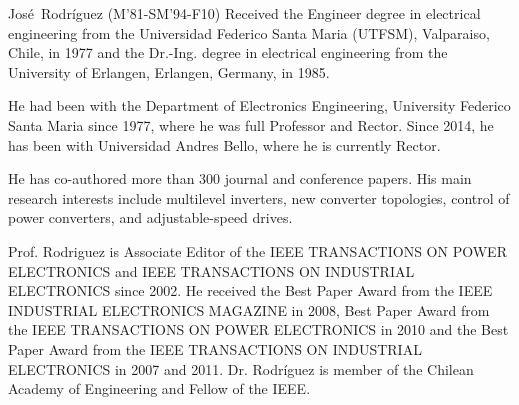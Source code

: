 \documentclass[a4paper, 8pt, twocolumn]{IEEEtran}
\begin{document}
\begin{IEEEbiography}{Jos\'{e}~Rodr\'{i}guez }
(M'81-SM'94-F10)   Received the Engineer degree in electrical engineering from the Universidad Federico Santa Maria (UTFSM), Valparaiso, Chile, in 1977 and the Dr.-Ing. degree in electrical engineering from the University of Erlangen, Erlangen, Germany, in 1985.

He had been with the Department of Electronics Engineering, University Federico Santa Maria since 1977, where he was full Professor and Rector. Since 2014, he has been with Universidad Andres Bello, where he is currently Rector.

He has co-authored more than 300 journal and conference papers. His main research interests include multilevel inverters, new converter topologies, control of power converters, and adjustable-speed drives.

Prof. Rodriguez is Associate Editor of the IEEE TRANSACTIONS ON POWER ELECTRONICS and IEEE TRANSACTIONS ON INDUSTRIAL ELECTRONICS since 2002. He received the Best Paper Award from the IEEE INDUSTRIAL ELECTRONICS MAGAZINE in 2008, Best Paper Award from the IEEE TRANSACTIONS ON POWER ELECTRONICS in 2010 and the Best Paper Award from the IEEE TRANSACTIONS ON INDUSTRIAL ELECTRONICS in 2007 and 2011.
Dr. Rodríguez is member of the Chilean Academy of Engineering and Fellow of the IEEE.  
\vspace{-8ex}
\end{IEEEbiography}
\fi
\end{document}
